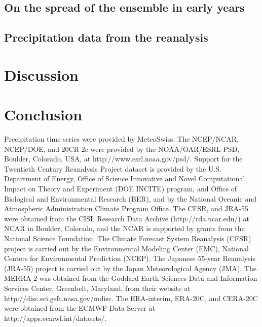 \documentclass{ametsoc}
\begin{document}
\subsection{On the spread of the ensemble in early years}



\subsection{Precipitation data from the reanalysis}


\section{Discussion}


\section{Conclusion}


%
\acknowledgments
Precipitation time series were provided by MeteoSwiss. The NCEP/NCAR, NCEP/DOE, and 20CR-2c were provided by the NOAA/OAR/ESRL PSD, Boulder, Colorado, USA, at http://www.esrl.noaa.gov/psd/. Support for the Twentieth Century Reanalysis Project dataset is provided by the U.S. Department of Energy, Office of Science Innovative and Novel Computational Impact on Theory and Experiment (DOE INCITE) program, and Office of Biological and Environmental Research (BER), and by the National Oceanic and Atmospheric Administration Climate Program Office. The CFSR, and JRA-55 were obtained from the CISL Research Data Archive (http://rda.ucar.edu/) at NCAR in Boulder, Colorado, and the NCAR is supported by grants from the National Science Foundation. The Climate Forecast System Reanalysis (CFSR) project is carried out by the Environmental Modeling Center (EMC), National Centers for Environmental Prediction (NCEP). The Japanese 55-year Reanalysis (JRA-55) project is carried out by the Japan Meteorological Agency (JMA). The MERRA-2 was obtained from the Goddard Earth Sciences Data and Information Services Center, Greenbelt, Maryland, from their website at http://disc.sci.gsfc.nasa.gov/mdisc. The ERA-interim, ERA-20C, and CERA-20C were obtained from the ECMWF Data Server at http://apps.ecmwf.int/datasets/. 
\end{document}
